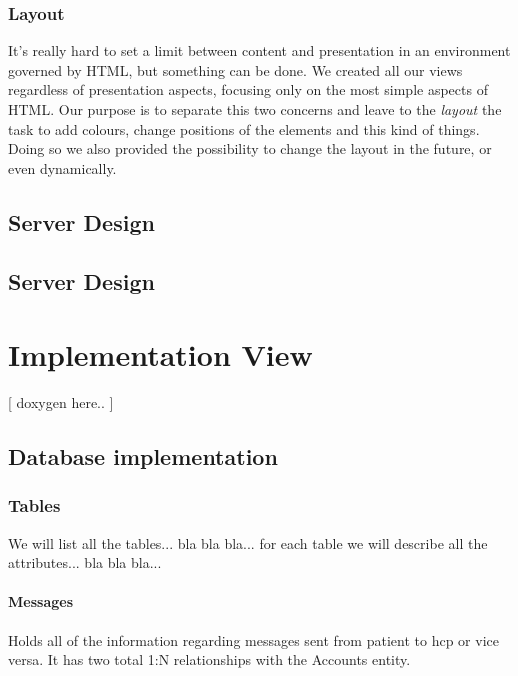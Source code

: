 \documentclass[12pt]{report}
\begin{document}
\begin{itemize}
\subsection{Layout}
It's really hard to set a limit between content and presentation in an environment governed by HTML, but something can be done. We created all our views regardless of presentation aspects, focusing only on the most simple aspects of HTML. Our purpose is to separate this two concerns and leave to the \emph{layout} the task to add colours, change positions of the elements and this kind of things. Doing so we also provided the possibility to change the layout in the future, or even dynamically.

\section{Server Design}


\section{Server Design}

\chapter{Implementation View}
[ doxygen here.. ]

\section{Database implementation}
\subsection{Tables}
We will list all the tables... bla bla bla... for each table we will describe all the attributes... bla bla bla...

\subsubsection{Messages}
Holds all of the information regarding messages sent from patient to hcp or vice versa. It has two total 1:N relationships with the Accounts entity.


\end{itemize}
\end{document}
